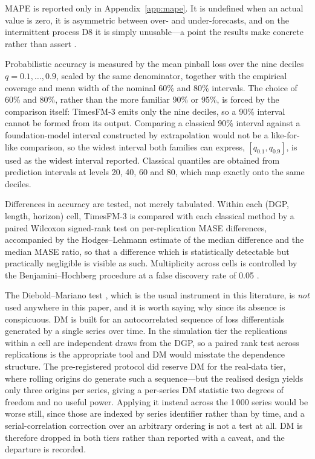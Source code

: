 \documentclass[article]{ajs}
\providecommand{\appendixref}[1]{Appendix~\ref{#1}}
\begin{document}
MAPE is reported only in \appendixref{app:mape}. It is undefined when an actual value is zero,
it is asymmetric between over- and under-forecasts, and on the intermittent process D8 it is
simply unusable---a point the results make concrete rather than assert
\citep{hyndman2006mase, kolassa2016count}.

Probabilistic accuracy is measured by the mean pinball loss over the nine deciles
$q = 0.1, \dots, 0.9$, scaled by the same denominator, together with the empirical coverage
and mean width of the nominal 60\% and 80\% intervals. The choice of 60\% and 80\%, rather
than the more familiar 90\% or 95\%, is forced by the comparison itself: TimesFM-3 emits only
the nine deciles, so a 90\% interval cannot be formed from its output. Comparing a classical
90\% interval against a foundation-model interval constructed by extrapolation would not be a
like-for-like comparison, so the widest interval both families can express, $[q_{0.1},
q_{0.9}]$, is used as the widest interval reported. Classical quantiles are obtained from
prediction intervals at levels 20, 40, 60 and 80, which map exactly onto the same deciles.

Differences in accuracy are tested, not merely tabulated. Within each (DGP, length, horizon)
cell, TimesFM-3 is compared with each classical method by a paired Wilcoxon signed-rank test
\citep{wilcoxon1945} on per-replication MASE differences, accompanied by the Hodges--Lehmann
estimate of the median difference \citep{hodges1963} and the median MASE ratio, so that a
difference which is statistically detectable but practically negligible is visible as such.
Multiplicity across cells is controlled by the Benjamini--Hochberg procedure at a false
discovery rate of 0.05 \citep{benjamini1995fdr}.

The Diebold--Mariano test \citep{diebold1995comparing}, which is the usual instrument in this
literature, is \emph{not} used anywhere in this paper, and it is worth saying why since its
absence is conspicuous. DM is built for an autocorrelated sequence of loss differentials
generated by a single series over time. In the simulation tier the replications within a cell
are independent draws from the DGP, so a paired rank test across replications is the
appropriate tool and DM would misstate the dependence structure. The pre-registered protocol
did reserve DM for the real-data tier, where rolling origins do generate such a sequence---but
the realised design yields only three origins per series, giving a per-series DM statistic two
degrees of freedom and no useful power. Applying it instead across the 1\,000 series would be
worse still, since those are indexed by series identifier rather than by time, and a
serial-correlation correction over an arbitrary ordering is not a test at all. DM is therefore
dropped in both tiers rather than reported with a caveat, and the departure is recorded.
\end{document}
